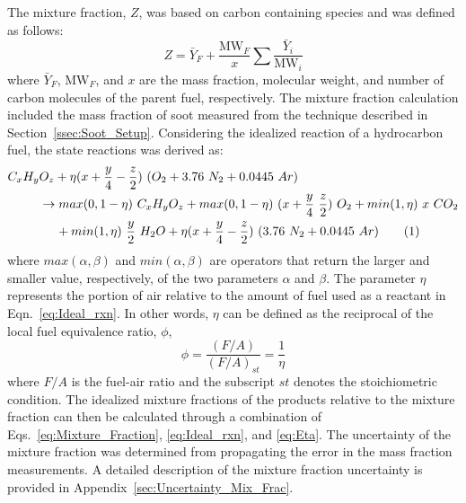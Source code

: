 \documentclass[12pt]{article}
\newcommand\numberthis{\addtocounter{equation}{1}\tag{\theequation}}
\begin{document}
The mixture fraction, $Z$, was based on carbon containing species and was defined as follows:
\begin{equation}\label{eq:Mixture_Fraction}
Z=\bar{Y}_{F}+\frac{{\textrm{MW}_{F}}}{x}\sum{\frac{\bar{Y}_{i}}{{\textrm{MW}_{i}}}}
\end{equation}
where $\bar{Y}_{F}$, ${\textrm{MW}_{F}}$, and $x$ are the mass fraction, molecular weight, and number of carbon molecules of the parent fuel, respectively. The mixture fraction calculation included the mass fraction of soot measured from the technique described in Section~\ref{ssec:Soot_Setup}.
Considering the idealized reaction of a hydrocarbon fuel, the state reactions was derived as:
\begin{align*}
C_{x}H_{y}&O_{z}+\eta(x+\frac{y}{4}-\frac{z}{2})~(O_{2}+3.76~N_{2}+0.0445~Ar)\\
&\rightarrow max(0,1-\eta)~C_{x}H_{y}O_{z}+max(0,1-\eta)~(x+\frac{y}{4}~\frac{z}{2})~O_{2}+ min(1,\eta)~x~CO_{2}\\
&~~~~+min(1,\eta)~\frac{y}{2}~H_{2}O+\eta(x+\frac{y}{4}-\frac{z}{2})~(3.76~N_{2}+0.0445~Ar) \numberthis \label{eq:Ideal_rxn}
\end{align*}
where $max(\alpha,\beta)$ and $min(\alpha,\beta)$ are operators that return the larger and smaller value, respectively, of the two parameters $\alpha$ and $\beta$. The parameter $\eta$ represents the portion of air relative to the amount of fuel used as a reactant in Eqn.~\ref{eq:Ideal_rxn}. In other words, $\eta$ can be defined as the reciprocal of the local fuel equivalence ratio, $\phi$,
\begin{equation}\label{eq:Eta}
\phi=\frac{(F/A)}{(F/A)_{st}}=\frac{1}{\eta}
\end{equation}
where $F/A$ is the fuel-air ratio and the subscript $st$ denotes the stoichiometric condition. The idealized mixture fractions of the products relative to the mixture fraction can then be calculated through a combination of Eqs.~\ref{eq:Mixture_Fraction}, \ref{eq:Ideal_rxn}, and \ref{eq:Eta}. The uncertainty of the mixture fraction was determined from propagating the error in the mass fraction measurements. A detailed description of the mixture fraction uncertainty is provided in Appendix~\ref{sec:Uncertainty_Mix_Frac}.
\end{document}
